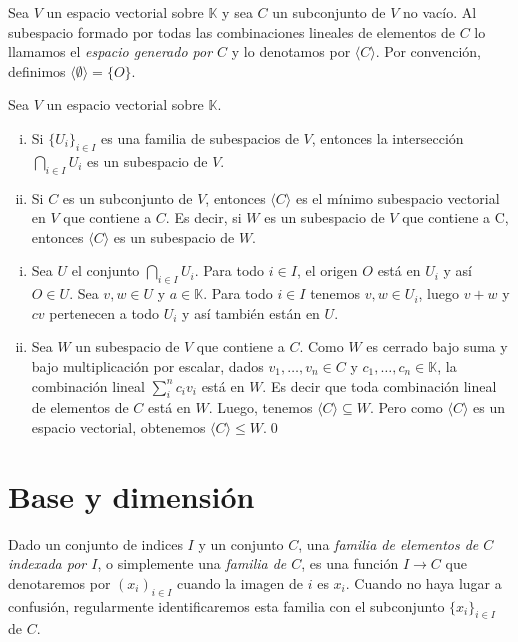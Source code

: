 \begin{defn}
Sea $V$ un espacio vectorial sobre $\mathbb{K}$ y sea $C$ un subconjunto de $V$ no vac\'io. Al subespacio formado por todas las combinaciones lineales de elementos de $C$ lo llamamos el \emph{espacio generado por $C$} y lo denotamos por $\langle C \rangle$. Por convenci\'on, definimos $\langle \emptyset\rangle=\{O\}$.
\end{defn}

\begin{prop}\label{propunion}
Sea $V$ un espacio vectorial sobre $\mathbb{K}$.
\begin{enumerate}[(i)]
\item Si $\{U_i\}_{i\in I}$ es una familia de subespacios de $V$, entonces la intersecci\'on $\bigcap_{i \in I} U_i$ es un subespacio de $V$.
\item Si $C$ es un subconjunto de $V$, entonces $\langle C\rangle$ es el m\'inimo subespacio vectorial en $V$ que contiene a $C$. Es decir, si $W$ es un subespacio de $V$ que contiene a C, entonces $\langle C\rangle$ es un subespacio de $W$.
\end{enumerate}
\end{prop}

\dem
\begin{enumerate}[(i)]
\item Sea $U$ el conjunto $\bigcap_{i\in I} U_i$. Para todo $i\in I$, el origen $O$ está en $U_i$ y así $O\in U$. Sea $v,w\in U$ y $a\in \mathbb{K}$. Para todo $i \in I$ tenemos $v,w\in U_i$, luego $v+w$ y $cv$ pertenecen a todo $U_i$ y as\'i tambi\'en est\'an en $U$.
\item Sea  $W$ un subespacio de $V$ que contiene a $C$. Como $W$ es cerrado bajo suma y bajo multiplicaci\'on por escalar, dados $v_1,\ldots,v_n\in C$ y $c_1,\ldots,c_n\in \mathbb{K}$, la combinaci\'on lineal $\sum_i^{n} c_iv_i$ est\'a en $W$. Es decir que toda combinaci\'on lineal de elementos de $C$ est\'a en $W$. Luego, tenemos $\langle C\rangle \subseteq W$. Pero como $\langle C\rangle$ es un espacio vectorial, obtenemos $\langle C\rangle \le W$.\qed
\end{enumerate}

\section{Base y dimensi\'on}

Dado un conjunto de indices $I$ y un conjunto $C$, una \emph{familia de elementos de $C$ indexada por $I$}, o simplemente una \emph{familia de $C$}, es una función $I\rightarrow C$ que denotaremos por $(x_i)_{i\in I}$ cuando la imagen de $i$ es $x_i$. Cuando no haya lugar a confusión, regularmente identificaremos esta familia con el subconjunto $\{x_i\}_{i\in I}$ de $C$.

